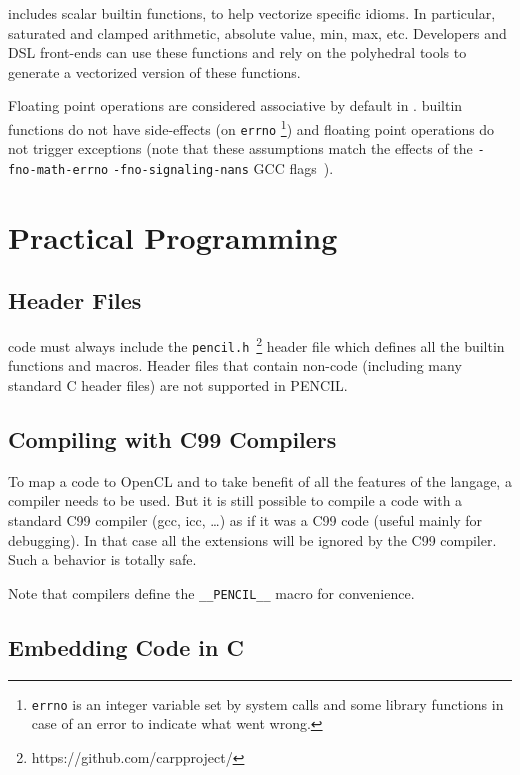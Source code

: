 \pencil includes scalar builtin functions, to help vectorize specific
idioms. In particular, saturated and clamped arithmetic, absolute
value, min, max, etc.  Developers and DSL front-ends can use these
functions and rely on the polyhedral tools to generate a vectorized
version of these functions.

Floating point operations are considered associative by default in \pencil.
\pencil builtin functions do not have side-effects (on \texttt{errno}
\footnote{\texttt{errno} is an integer variable set by system calls and
some library functions in case of an error to indicate what went wrong.})
and floating point operations do not trigger exceptions (note that these
assumptions match the effects of the \texttt{-fno-math-errno}
\texttt{-fno-signaling-nans} GCC flags~\cite{gccguide}).

\section{Practical \pencil Programming}

\subsection{Header Files}
\pencil code must always include
the \texttt{pencil.h}~\footnote{https://github.com/carpproject/} header file
which defines all the \pencil builtin functions and macros.
Header files that contain non-\pencil code (including many standard C header
files) are not supported in PENCIL.


\subsection{Compiling \pencil with C99 Compilers}

To map a \pencil code to OpenCL and to take benefit of all the features
of the \pencil langage, a \pencil compiler needs to be used.
But it is still possible to compile a \pencil code with a standard C99
compiler (gcc, icc, \dots) as if it was a C99 code (useful mainly for
debugging).
In that case all the \pencil extensions will be ignored by the C99
compiler.  Such a behavior is totally safe.

Note that \pencil compilers define the \lstinline!__PENCIL__! macro
for convenience.


\subsection{Embedding \pencil Code in C}
\label{sec:pencil-as-c-ext}

